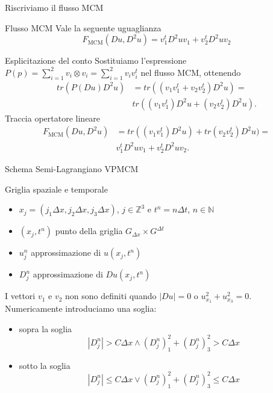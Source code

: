 \begin{frame}{Riscriviamo il flusso MCM}
  \begin{alertblock}{Flusso MCM}
    Vale la seguente uguaglianza
    \[
    F_{\text{MCM}}(Du,D^2u)=v_1^tD^2uv_1+v_2^tD^2uv_2
    \]
  \end{alertblock}
  \begin{block}{Esplicitazione del conto}
  Sostituiamo l'espressione  $P(p)=\sum_{i=1}^2v_i\otimes
  v_i=\sum_{i=1}^2v_iv_i^t$ nel flusso MCM, ottenendo
  \[
  \begin{aligned}
    tr(P(Du)D^2u)&=tr((v_1v_1^t+v_2v_2^t)D^2u)=\\
    &tr((v_1v_1^t)D^2u+(v_2v_2^t)D^2u).
  \end{aligned}
  \]
  Traccia opertatore lineare
  \[
  \begin{aligned}
    F_{\text{MCM}}(Du,D^2u)&=tr((v_1v_1^t)D^2u)+tr(v_2v_2^t)D^2u)=\\
    &v_1^tD^2uv_1+v_2^tD^2uv_2.
  \end{aligned}
    \]
  \end{block}
\end{frame}

\begin{frame}{Schema Semi-Lagrangiano VPMCM}
  \begin{block}{Griglia spaziale e temporale}
    \begin{itemize}
      \item $x_j=(j_1\Delta x,j_2\Delta x,j_3\Delta x)$,
        $j\in\mathbb{Z}^3$ e $t^n=n\Delta t$, $n\in\mathbb{N}$
      \item $(x_j,t^n)$ punto della griglia $G_{\Delta x}\times
        G^{\Delta t}$
      \item $u_j^n$ approssimazione di $u(x_j,t^n)$
      \item $D_j^n$ approssimazione di $Du(x_j,t^n)$
    \end{itemize}
    \end{block}
  \begin{osservazione}
    I vettori $v_1$ e $v_2$ non sono definiti quando $|Du|=0$ o
    $u_{x_1}^2+u_{x_3}^2=0$. Numericamente introduciamo una soglia:
    \begin{itemize}
    \item \alert{sopra la soglia}
      \[
      |D_j^n|>C\Delta x \land (D_j^n)_1^2+(D_j^n)_3^2>C\Delta x
      \]
    \item \alert{sotto la soglia}
      \[
      |D_j^n|\leq C\Delta x \lor (D_j^n)_1^2+(D_j^n)_3^2\leq C\Delta x
      \]
      \end{itemize}
    \end{osservazione}
\end{frame}

